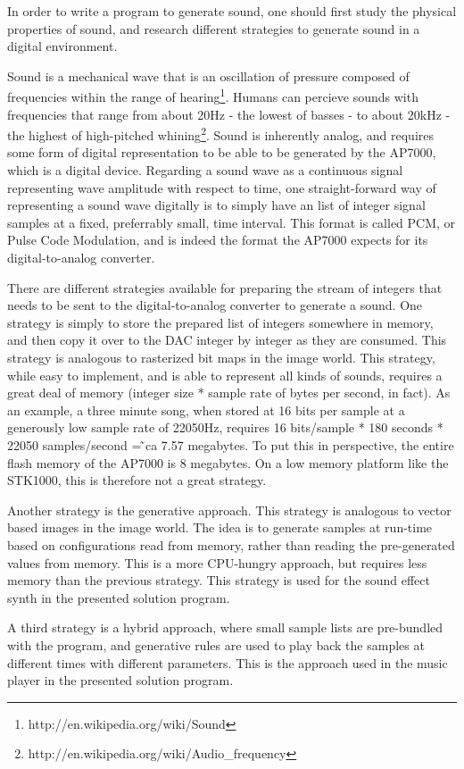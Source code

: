 In order to write a program to generate sound, one should first study the physical properties of sound, and research different strategies to generate sound in a digital environment.

Sound is a mechanical wave that is an oscillation of pressure composed of frequencies within the range of hearing\footnote{http://en.wikipedia.org/wiki/Sound}. Humans can percieve sounds with frequencies that range from about 20Hz - the lowest of basses - to about 20kHz - the highest of high-pitched whining\footnote{http://en.wikipedia.org/wiki/Audio_frequency}.
Sound is inherently analog, and requires some form of digital representation to be able to be generated by the AP7000, which is a digital device.
Regarding a sound wave as a continuous signal representing wave amplitude with respect to time, one straight-forward way of representing a sound wave digitally is to simply have an list of integer signal samples at a fixed, preferrably small, time interval.
This format is called PCM, or Pulse Code Modulation, and is indeed the format the AP7000 expects for its digital-to-analog converter.

There are different strategies available for preparing the stream of integers that needs to be sent to the digital-to-analog converter to generate a sound.
One strategy is simply to store the prepared list of integers somewhere in memory, and then copy it over to the DAC integer by integer as they are consumed.
This strategy is analogous to rasterized bit maps in the image world.
This strategy, while easy to implement, and is able to represent all kinds of sounds, requires a great deal of memory (integer size * sample rate of bytes per second, in fact).
As an example, a three minute song, when stored at 16 bits per sample at a generously low sample rate of 22050Hz, requires 16 bits/sample * 180 seconds * 22050 samples/second = ̃ca 7.57 megabytes.
To put this in perspective, the entire flash memory of the AP7000 is 8 megabytes.
On a low memory platform like the STK1000, this is therefore not a great strategy.

Another strategy is the generative approach.
This strategy is analogous to vector based images in the image world.
The idea is to generate samples at run-time based on configurations read from memory, rather than reading the pre-generated values from memory.
This is a more CPU-hungry approach, but requires less memory than the previous strategy.
This strategy is used for the sound effect synth in the presented solution program.

A third strategy is a hybrid approach, where small sample lists are pre-bundled with the program, and generative rules are used to play back the samples at different times with different parameters.
This is the approach used in the music player in the presented solution program.
